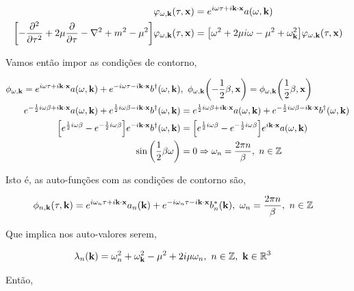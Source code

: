 \documentclass[twoside]{amsart}
\numberwithin{equation}{section}
\begin{document}
\begin{align}
    \varphi_{\omega,\vb k}\qty(\tau,\vb x)&=e^{i\omega\tau+i\vb k\cdot\vb x}a\qty(\omega,\vb k)\\
    \qty[-\pdv[2]{}{\tau}+2\mu\pdv{}{\tau}-\laplacian+m^2-\mu^2]\varphi_{\omega,\vb k}\qty(\tau,\vb x)&=\qty[\omega^2+2\mu i\omega-\mu^2+\omega_{\vb k}^2]\varphi_{\omega,\vb k}\qty(\tau,\vb x)
\end{align}

Vamos então impor as condições de contorno,

\begin{align}
    \phi_{\omega,\vb k}=e^{i\omega\tau+i\vb k\cdot\vb x}a\qty(\omega,\vb k)+e^{-i\omega\tau-i\vb k\cdot\vb x}b^\dagger\qty(\omega,\vb k)&,\ \phi_{\omega,\vb k}\qty(-\frac12\beta,\vb x)=\phi_{\omega,\vb k}\qty(\frac12\beta,\vb x)\\
    e^{-\frac12i\omega\beta+i\vb k\cdot\vb x}a\qty(\omega,\vb k)+e^{\frac12i\omega\beta-i\vb k\cdot\vb x}b^\dagger\qty(\omega,\vb k)&=e^{\frac12i\omega\beta+i\vb k\cdot\vb x}a\qty(\omega,\vb k)+e^{-\frac12i\omega\beta-i\vb k\cdot\vb x}b^\dagger\qty(\omega,\vb k)\\
    \qty[e^{\frac12i\omega\beta}-e^{-\frac12i\omega\beta}]e^{-i\vb k\cdot\vb x}b^\dagger\qty(\omega,\vb k)&=\qty[e^{\frac12i\omega\beta}-e^{-\frac12i\omega\beta}]e^{i\vb k\cdot\vb x}a\qty(\omega,\vb k)\\
    \sin\qty(\frac12\beta\omega)&=0\Rightarrow \omega_n=\frac{2\pi n}{\beta},\ n\in\mathbb Z
\end{align}

Isto é, as auto-funções com as condições de contorno são,

\begin{align}
    \phi_{n,\vb k}\qty(\tau,\vb k)&=e^{i\omega_n\tau+i\vb k\cdot\vb x}a_n\qty(\vb k)+e^{-i\omega_n\tau-i\vb k\cdot\vb x}b_n^\ast\qty(\vb k),\ \omega_n=\frac{2\pi n}{\beta},\ n\in\mathbb Z
\end{align}

Que implica nos auto-valores serem,

\begin{align}
    \lambda_n\qty(\vb k)&=\omega_n^2+\omega_{\vb k}^2-\mu^2+2i\mu\omega_n,\ n\in\mathbb Z,\ \vb k \in\mathbb R^3
\end{align}

Então,
\end{document}

